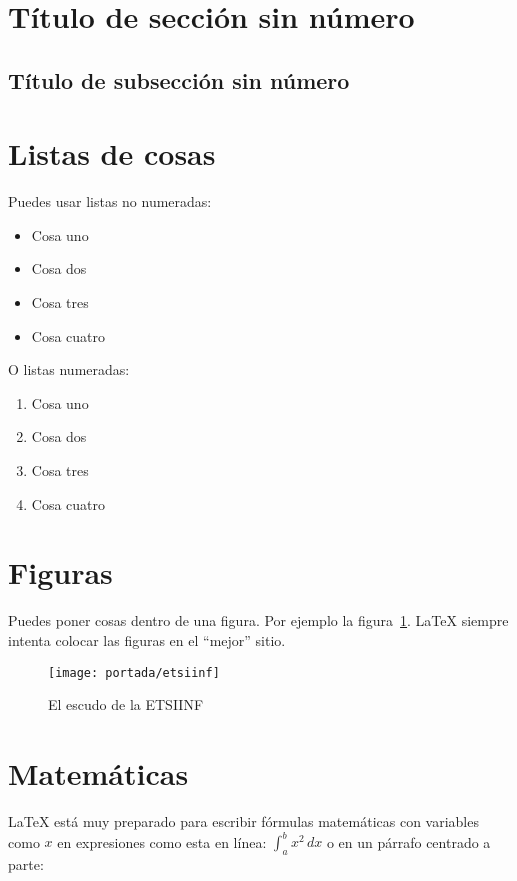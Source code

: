 \section*{Título de sección sin número}

\subsection*{Título de subsección sin número}

\section{Listas de cosas}

Puedes usar listas no numeradas:
\begin{itemize}
\item Cosa uno
\item Cosa dos
\item Cosa tres
\item Cosa cuatro
\end{itemize}

O listas numeradas:
\begin{enumerate}
\item Cosa uno
\item Cosa dos
\item Cosa tres
\item Cosa cuatro
\end{enumerate}

\section{Figuras}

Puedes poner cosas dentro de una figura. Por ejemplo la
figura~\ref{fig:escudo}. LaTeX siempre intenta colocar las figuras en
el ``mejor'' sitio.

\begin{figure}[h]
  \centering
  \texttt{[image: portada/etsiinf]}
  \caption{El escudo de la ETSIINF}
  \label{fig:escudo}
\end{figure}

\section{Matemáticas}

LaTeX está muy preparado para escribir fórmulas matemáticas con variables como $x$ en expresiones como esta en línea: \(\int_{a}^{b} x^2 \,dx\) o en un párrafo centrado a parte:

